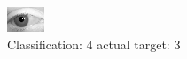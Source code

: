 \begin{figure}[h!]
\begin{center}
\includegraphics[width=0.60\columnwidth]{figures/ID2835_class_4_target_3.png}
\end{center}
\caption{ Classification: 4 actual target: 3}
\label{fig:ID2835_class_4_target_3}
\end{figure}

